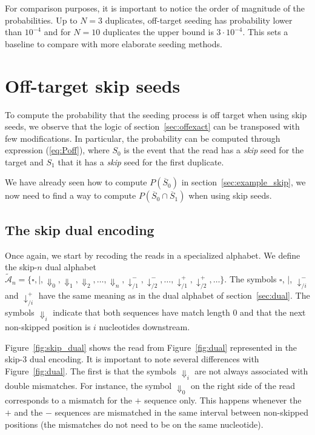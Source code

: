 \documentclass{article}
\begin{document}
For comparison purposes, it is important to notice the order of magnitude
of the probabilities. Up to $N=3$ duplicates, off-target seeding has
probability lower than $10^{-4}$ and for $N=10$ duplicates the upper bound
is $3\cdot10^{-4}$. This sets a baseline to compare with more elaborate
seeding methods.


\section{Off-target skip seeds}

To compute the probability that the seeding process is off target when
using skip seeds, we observe that the logic of section~\ref{sec:offexact}
can be transposed with few modifications. In particular, the probability
can be computed through expression (\ref{eq:Poff}), where $S_0$ is the
event that the read has a \emph{skip} seed for the target and $S_1$ that
it has a \emph{skip} seed for the first duplicate.

We have already seen how to compute $P(\overline{S}_0)$ in
section~\ref{sec:example_skip}, we now need to find a way to compute
$P(\overline{S}_0 \cap \overline{S}_1)$ when using skip seeds.

\subsection{The skip dual encoding}

Once again, we start by recoding the reads in a specialized alphabet. We
define the skip-$n$ dual alphabet $\tilde{\mathcal{A}}_n = \{\square, |,
\Downarrow_0, \Downarrow_1, \Downarrow_2, \ldots, \Downarrow_n,
\downarrow^-_{/1}, \downarrow^-_{/2}, \ldots, \downarrow^+_{/1},
\downarrow^+_{/2}, \ldots\}$. The symbols $\square$, $|$,
$\downarrow^-_{/i}$ and $\downarrow^+_{/i}$ have the same meaning as in
the dual alphabet of section~\ref{sec:dual}. The symbols $\Downarrow_i$
indicate that both sequences have match length 0 and that the next
non-skipped position is $i$ nucleotides downstream.
 
Figure~\ref{fig:skip_dual} shows the read from Figure~\ref{fig:dual}
represented in the skip-3 dual encoding. It is important to note several
differences with Figure~\ref{fig:dual}. The first is that the symbols
$\Downarrow_i$ are not always associated with double mismatches. For
instance, the symbol $\Downarrow_0$ on the right side of the read
corresponds to a mismatch for the $+$ sequence only. This happens whenever
the $+$ and the $-$ sequences are mismatched in the same interval between
non-skipped positions (the mismatches do not need to be on the same
nucleotide).
\end{document}
